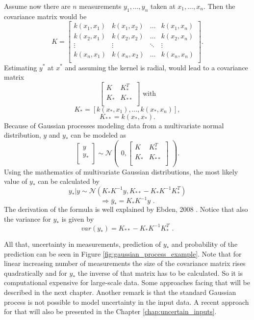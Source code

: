 Assume now there are $n$ measurements $y_1, ..., y_n$ taken at $x_1, ..., x_n$. Then the covariance matrix 
would be
$$
K = \begin{bmatrix}
	k(x_1, x_1) & k(x_1, x_2) & \dots & k(x_1, x_n) \\
	k(x_2, x_1) & k(x_2, x_2) & \dots & k(x_2, x_n) \\
	\vdots & \vdots & \ddots & \vdots \\
	k(x_n, x_1) & k(x_n, x_2) & \dots & k(x_n, x_n) \\
\end{bmatrix}\text{.}
$$
Estimating $y^*$ at $x^*$ and assuming the kernel is radial, would lead to a covariance matrix
$$
\begin{bmatrix}
	K & K_*^T \\
	K_* & K_{**} \\
\end{bmatrix} \text{ with}
$$
$$
K_* = [k(x_*, x_1), \dots, k(x_*, x_n)],
$$
$$
K_{**} = k(x_*, x_*)\text{.}
$$
Because of Gaussian processes modeling data from a multivariate normal distribution, $y$ and $y_*$ 
can be modeled as
$$
\begin{bmatrix}
	y \\
	y_* \\
\end{bmatrix} 
\sim
\mathcal{N} 
\begin{pmatrix}
	0, 
	\begin{bmatrix}
		K & K_*^T \\
		K_* & K_{**} \\
	\end{bmatrix}
\end{pmatrix}\text{.}
$$
Using the mathematics of multivariate Gaussian distributions, the most likely value of $y_*$ can be 
calculated by
\newpage
$$
y_*|y \sim \mathcal{N}(K_*K^{-1}y, K_{**} - K_*K^{-1}K_*^T)
$$
$$
\Rightarrow \bar{y}_* = K_*K^{-1}y\text{ .}
$$
The derivation of the formula is well explained by Ebden, 2008 \cite{ebden_gaussian_2015}. Notice that
also the variance for $y_*$ is given by
$$
var(y_*) = K_{**} - K_*K^{-1}K_*^T\text{ .}
$$

All that, uncertainty in measurements, prediction of $y_*$ and probability of the prediction can be seen
in Figure \ref{fig:gaussian_process_example}. Note that for linear increasing number of measurements the 
size of the covariance matrix rises quadratically and for $y_*$ the inverse of that matrix has to be calculated. 
So it is computational expensive for large-scale data. Some approaches facing that will be described in the 
next chapter. Another remark is that the standard Gaussian process is not possible to model uncertainty in the 
input data. A recent approach for that will also be presented in the Chapter \ref{chap:uncertain_inputs}. 


